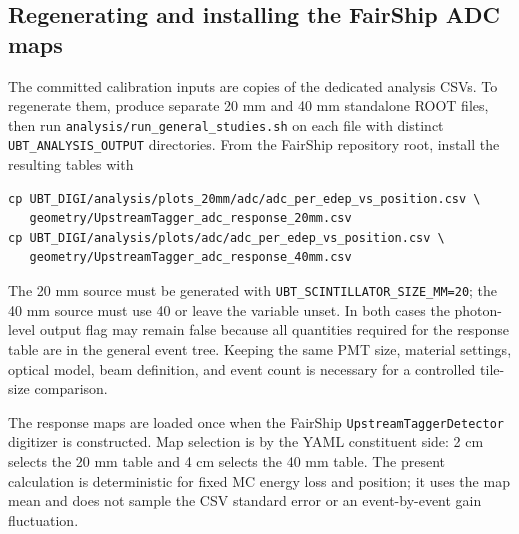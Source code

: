 \subsection{Regenerating and installing the FairShip ADC maps}

\begin{technicaldetails}
The committed calibration inputs are copies of the dedicated analysis CSVs.
To regenerate them, produce separate 20 mm and 40 mm standalone ROOT files,
then run \texttt{analysis/run\_general\_studies.sh} on each file with distinct
\texttt{UBT\_ANALYSIS\_OUTPUT} directories.  From the FairShip repository root,
install the resulting tables with
\begin{verbatim}
cp UBT_DIGI/analysis/plots_20mm/adc/adc_per_edep_vs_position.csv \
   geometry/UpstreamTagger_adc_response_20mm.csv
cp UBT_DIGI/analysis/plots/adc/adc_per_edep_vs_position.csv \
   geometry/UpstreamTagger_adc_response_40mm.csv
\end{verbatim}
The 20 mm source must be generated with
\texttt{UBT\_SCINTILLATOR\_SIZE\_MM=20}; the 40 mm source must use 40 or leave
the variable unset.  In both cases the photon-level output flag may remain
false because all quantities required for the response table are in the
general event tree.  Keeping the same PMT size, material settings, optical
model, beam definition, and event count is necessary for a controlled
tile-size comparison.

The response maps are loaded once when the FairShip
\texttt{UpstreamTaggerDetector} digitizer is constructed.  Map selection is by
the YAML constituent side: 2 cm selects the 20 mm table and 4 cm selects the
40 mm table.  The present calculation is deterministic for fixed MC energy
loss and position; it uses the map mean and does not sample the CSV standard
error or an event-by-event gain fluctuation.
\end{technicaldetails}


